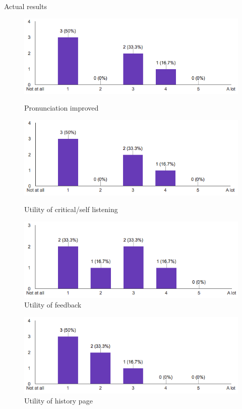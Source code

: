 Actual results

\begin{figure}[!ht]
	\centering
	\begin{minipage}{.5\textwidth}
		\centering
		\includegraphics[scale=0.5]{Figures/responses/application_improved_pronunciation.png}
		\caption{Pronunciation improved}
		\label{fig:int_improving_lang}
	\end{minipage}%
	\begin{minipage}{.5\textwidth}
		\centering
		\includegraphics[scale=0.5]{Figures/responses/utility_of_listening.png}
		\caption{Utility of critical/self listening}
		\label{fig:int_learnign_lang}
	\end{minipage}
	\begin{minipage}{.5\textwidth}
		\centering
		\includegraphics[scale=0.5]{Figures/responses/application_rate_feedback.png}
		\caption{Utility of feedback}
		\label{fig:int_usage_smartphone}
	\end{minipage}%
\end{figure}

\begin{figure}[!ht]
	\centering
	\includegraphics[scale=0.5]{Figures/responses/utility_of_history.png}
	\caption{Utility of history page}
	\label{fig:int_usage_smartphone}
\end{figure}%